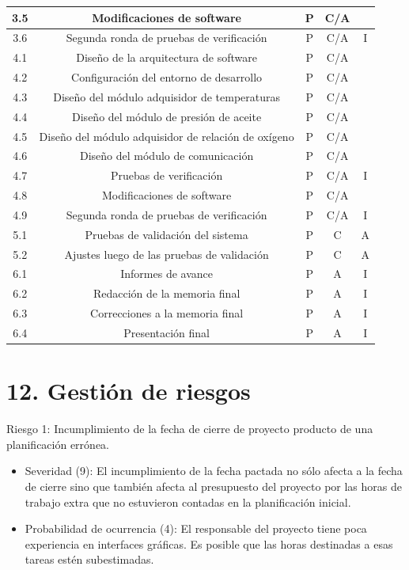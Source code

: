 \documentclass[11pt]{charter}
\begin{document}
\begin{table}[htpb]
{\begin{tabular}{@{}|c|c|c|c|c|@{}}
 3.5 & Modificaciones de software								 & P  & C/A &  \\ \hline
 3.6 & Segunda ronda de pruebas de verificación				 & P  & C/A & I  \\ \hline
 4.1 & Diseño de la arquitectura de software					 & P  & C/A &  \\ \hline
 4.2 & Configuración del entorno de desarrollo					 & P  & C/A &  \\ \hline
 4.3 & Diseño del módulo adquisidor de temperaturas			 & P  & C/A &  \\ \hline
 4.4 & Diseño del módulo de presión de aceite					 & P  & C/A &  \\ \hline
 4.5 & Diseño del módulo adquisidor de relación de oxígeno		 & P  & C/A &  \\ \hline
 4.6 & Diseño del módulo de comunicación						 & P  & C/A &  \\ \hline
 4.7 & Pruebas de verificación									 & P  & C/A & I  \\ \hline
 4.8 & Modificaciones de software								 & P  & C/A &  \\ \hline
 4.9 & Segunda ronda de pruebas de verificación				 & P  & C/A & I  \\ \hline
 5.1 & Pruebas de validación del sistema			             & P  & C & A \\ \hline
 5.2 & Ajustes luego de las pruebas de validación				 & P  & C & A \\ \hline
 6.1 & Informes de avance  										 & P  & A & I  \\ \hline
 6.2 & Redacción de la memoria final				 			 & P  & A & I \\ \hline
 6.3 & Correcciones a la memoria final 							 & P  & A & I  \\ \hline
 6.4 & Presentación final  										 & P  & A & I  \\ \hline
\end{tabular}%
}
\end{table}

\section{12. Gestión de riesgos}
\label{sec:riesgos}

Riesgo 1: Incumplimiento de la fecha de cierre de proyecto producto de una planificación errónea.
\begin{itemize}
\item Severidad (9): El incumplimiento de la fecha pactada no sólo afecta a la fecha de cierre sino que también afecta al presupuesto del proyecto por las horas de trabajo extra que no estuvieron contadas en la planificación inicial.
\item Probabilidad de ocurrencia (4): El responsable del proyecto tiene poca experiencia en interfaces gráficas. Es posible que las horas destinadas a esas tareas estén subestimadas.
\end{itemize}  
\end{document}
